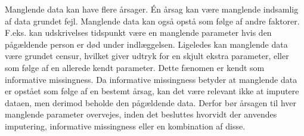 Manglende data kan have flere årsager. Én årsag kan være manglende indsamlig af data grundet fejl. Manglende data kan også opstå som følge af andre faktorer. F.eks. kan udskrivelses tidspunkt være en manglende parameter hvis den pågældende person er død under indlæggelsen. Ligeledes kan manglende data være grundet censur, hvilket giver udtryk for en skjult ekstra parameter, eller som følge af en allerede kendt parameter.\cite{Kuhn2013} Dette fænomen er kendt som informative missingness. Da informative missingness betyder at manglende data er opstået som følge af en bestemt årsag, kan det være relevant ikke at imputere dataen, men derimod beholde den pågældende data. Derfor bør årsagen til hver manglende parameter overvejes, inden det besluttes hvorvidt der anvendes imputering, informative missingness eller en kombination af disse.